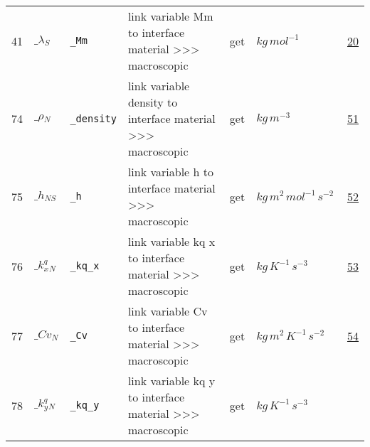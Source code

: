\begin{longtable}{|p{1cm}|p{2.5cm}|p{4.5cm}|p{8cm}|p{3.0cm}|p{3cm}|p{1cm}|}
            41
             & \hypertarget{"v:41"}{ $ {{\_\lambda}}{_{S}} $}
             & \verb|_Mm|
             & link variable Mm to interface material >>> macroscopic
             & \begin{lay}get \end{lay}
             & $ kg \,mol^{-1} \, $
             &                 \hyperlink{"e:20"}{ 20 }
                 \\
            74
             & \hypertarget{"v:74"}{ $ {{\_\rho}}{_{N}} $}
             & \verb|_density|
             & link variable density to interface material >>> macroscopic
             & \begin{lay}get \end{lay}
             & $ kg \,m^{-3} \, $
             &                 \hyperlink{"e:51"}{ 51 }
                 \\
            75
             & \hypertarget{"v:75"}{ $ {{\_h}}{_{{N S}}} $}
             & \verb|_h|
             & link variable h to interface material >>> macroscopic
             & \begin{lay}get \end{lay}
             & $ kg \,m^{2} \,mol^{-1} \,s^{-2} \, $
             &                 \hyperlink{"e:52"}{ 52 }
                 \\
            76
             & \hypertarget{"v:76"}{ $ {{\_k^q_x}}{_{N}} $}
             & \verb|_kq_x|
             & link variable kq x to interface material >>> macroscopic
             & \begin{lay}get \end{lay}
             & $ kg \,K^{-1} \,s^{-3} \, $
             &                 \hyperlink{"e:53"}{ 53 }
                 \\
            77
             & \hypertarget{"v:77"}{ $ {{\_Cv}}{_{N}} $}
             & \verb|_Cv|
             & link variable Cv to interface material >>> macroscopic
             & \begin{lay}get \end{lay}
             & $ kg \,m^{2} \,K^{-1} \,s^{-2} \, $
             &                 \hyperlink{"e:54"}{ 54 }
                 \\
            78
             & \hypertarget{"v:78"}{ $ {{\_k^q_y}}{_{N}} $}
             & \verb|_kq_y|
             & link variable kq y to interface material >>> macroscopic
             & \begin{lay}get \end{lay}
             & $ kg \,K^{-1} \,s^{-3} \, $

\end{longtable}
